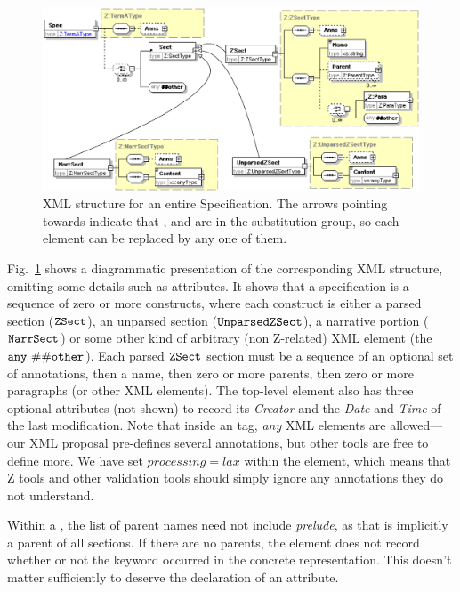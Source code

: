 \documentclass{llncs}  %
\begin{document}
\begin{figure}[htb]
  \centering
  \includegraphics[width=\textwidth]{specall.eps}
  \caption{XML structure for an entire Specification.  The arrows pointing
  towards  indicate that 
  ,  and  are in the
   substitution group, so each  element can be
  replaced by any one of them.} 
  \label{fig:spec}
\end{figure}

Fig.~\ref{fig:spec}
shows a diagrammatic presentation of the corresponding XML
structure, omitting some details such as attributes.
It shows that a specification is a sequence of zero or more constructs,
where each construct is either a parsed section (${\tt ZSect}$), 
an unparsed section (${\tt UnparsedZSect}$), a narrative portion
(${\tt NarrSect}$) or some other kind of arbitrary (non Z-related) XML
element (the ${\tt any\ \#\#other}$).  Each parsed ${\tt ZSect}$
section must be  
a sequence of an optional set of annotations, then a name, then zero or
more parents, then zero or more paragraphs (or other XML elements).
The top-level  element also has three optional attributes 
(not shown) to record its \emph{Creator} and the \emph{Date} and
\emph{Time} of the last modification. 
Note that inside an  tag, \emph{any} XML elements are
allowed---our XML proposal pre-defines several annotations,
but other tools are free to define more.  We have set $processing=lax$
within the  element, which means that Z tools and other
validation tools should simply ignore any annotations they do not
understand. 

Within a , the list of parent names need not include
\textit{prelude}, as that is implicitly a parent of all sections.
If there are no parents,
the  element does not record whether or not
the keyword  occurred in the concrete representation.
This doesn't matter sufficiently to deserve the declaration of an attribute.
\end{document}
